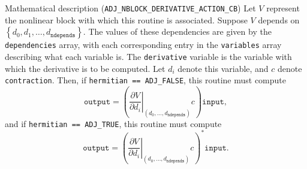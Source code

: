 \begin{boxwithtitle}{Mathematical description (\texttt{ADJ_NBLOCK_DERIVATIVE_ACTION_CB})}
Let $V$ represent the nonlinear block with which this routine is associated. 
Suppose $V$ depends on $\left\{d_0, d_1, \dots, d_\texttt{ndepends}\right\}$. The values of these                                                  
dependencies are given by the \texttt{dependencies} array, with each corresponding entry in the \texttt{variables} array describing what each variable is. The \texttt{derivative} variable
is the variable with which the derivative is to be computed. Let $d_i$ denote this variable, and $c$ denote \texttt{contraction}.
Then, if \texttt{hermitian == ADJ_FALSE}, this routine must compute
\begin{equation*}
\texttt{output} = \left(\left.\frac{\partial V}{\partial d_i}\right|_{(d_0, \dots, d_{\texttt{ndepends}})}c\right)\texttt{input}, 
\end{equation*}
and if \texttt{hermitian == ADJ_TRUE}, this routine must compute
\begin{equation*}
\texttt{output} = \left(\left.\frac{\partial V}{\partial d_i}\right|_{(d_0, \dots, d_{\texttt{ndepends}})}c\right)^{*}\texttt{input}. 
\end{equation*}
\end{boxwithtitle}

